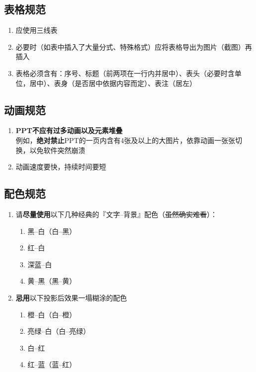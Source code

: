 \subsection[表格规范]{表格规范}
\begin{enumerate}
    \item 应使用三线表
    \item 必要时（如表中插入了大量分式、特殊格式）应将表格导出为图片（截图）再插入
    \item 表格必须含有：序号、标题（前两项在一行内并居中）、表头（必要时含单位，居中）、表身（是否居中依据内容而定）、表注（居左）
\end{enumerate}

\subsection[动画规范]{动画规范}
\begin{enumerate}
    \item \textbf{PPT不应有过多动画以及元素堆叠}\\
          例如，\textbf{绝对禁止}PPT的一页内含有4张及以上的大图片，依靠动画一张张切换，以免软件突然崩溃
    \item 动画速度要快，持续时间要短
\end{enumerate}

\subsection[配色规范]{配色规范}
\begin{enumerate}
    \item 请\textbf{尽量使用}以下几种经典的『文字--背景』配色（\st{虽然确实难看}）：
          \begin{enumerate}
              \item 黑--白（白--黑）
              \item 红--白
              \item 深蓝--白
              \item 黄--黑（黑--黄）
          \end{enumerate}
    \item \textbf{忌用}以下投影后效果一塌糊涂的配色
          \begin{enumerate}
              \item 橙--白（白--橙）
              \item 亮绿--白（白--亮绿）
              \item 白--红
              \item 红--蓝（蓝--红）
          \end{enumerate}
\end{enumerate}

